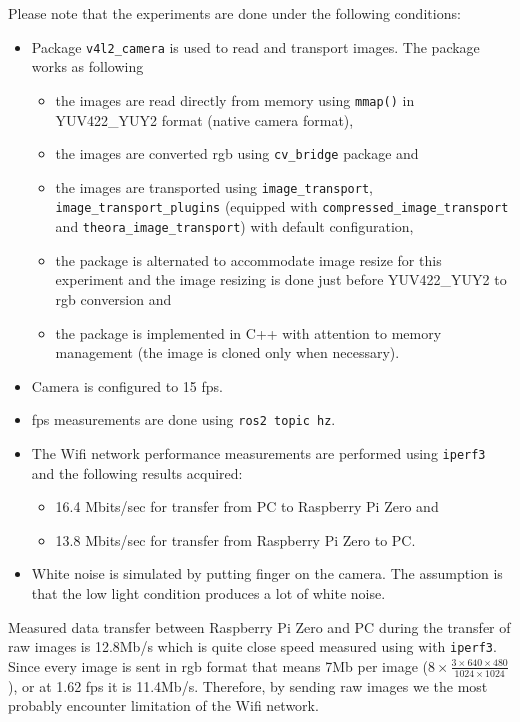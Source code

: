 Please note that the experiments are done under the following conditions:
\begin{itemize}
    \item Package \texttt{v4l2\_camera} is used to read and transport images. The package works as following \begin{itemize}
        \item the images are read directly from memory using \texttt{mmap()} in YUV422\_YUY2 format (native camera format),
        \item the images are converted \ac{rgb} using \texttt{cv\_bridge} package and
        \item the images are transported using \texttt{image\_transport}, \texttt{image\_transport\_plugins} (equipped with \texttt{compressed\_image\_transport} and \texttt{theora\_image\_transport}) with default configuration,
        \item the package is alternated to accommodate image resize for this experiment and the image resizing is done just before YUV422\_YUY2 to \ac{rgb} conversion and
        \item the package is implemented in C++ with attention to memory management (the image is cloned only when necessary).
    \end{itemize}
    \item Camera is configured to 15 \ac{fps}.
    \item \ac{fps} measurements are done using \texttt{ros2 topic hz}.
    \item The Wifi network performance measurements are performed using \texttt{iperf3} and the following results acquired: \begin{itemize}
        \item 16.4 Mbits/sec for transfer from PC to Raspberry Pi Zero and
        \item 13.8 Mbits/sec for transfer from Raspberry Pi Zero to PC.
    \end{itemize}
    \item White noise is simulated by putting finger on the camera. The assumption is that the low light condition produces a lot of white noise. 
\end{itemize}

Measured data transfer between Raspberry Pi Zero and PC during the transfer of raw images is 12.8Mb/s which is quite close speed measured using with \texttt{iperf3}. Since every image is sent in \ac{rgb} format that means 7Mb per image ($ 8 \times \frac{ 3 \times 640 \times 480 }{1024 \times 1024}$), or at 1.62 \ac{fps} it is 11.4Mb/s. Therefore, by sending raw images we the most probably encounter limitation of the Wifi network.


